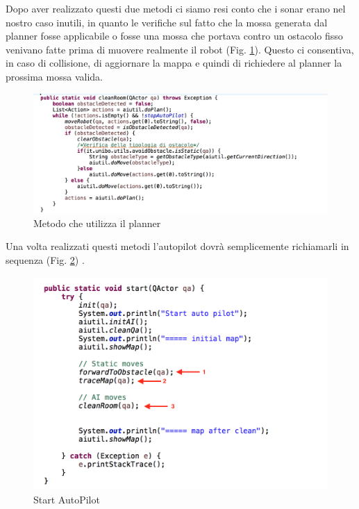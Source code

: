 \documentclass{llncs}
\begin{document}
Dopo aver realizzato questi due metodi ci siamo resi conto che i sonar erano nel nostro caso inutili, in quanto le verifiche sul fatto che la mossa generata dal planner fosse applicabile o fosse una mossa che portava contro un ostacolo fisso venivano fatte prima di muovere realmente il robot (Fig. \hyperref[fig:clearRoom]{\ref{fig:clearRoom}}). Questo ci consentiva, in caso di collisione, di aggiornare la mappa e quindi di richiedere al planner la prossima mossa valida.\\
\begin{figure}
    \centering
    \includegraphics[width=1\textwidth]{Immagini/Requisito5/clearRoom.png}
    \caption{Metodo che utilizza il planner}
    \label{fig:clearRoom}
\end{figure}
Una volta realizzati questi metodi l'autopilot dovr\`a semplicemente richiamarli in sequenza (Fig. \hyperref[fig:autopilot]{\ref{fig:autopilot}}) .\\
\begin{figure}
    \centering
    \includegraphics[width=1\textwidth]{Immagini/Requisito5/AutoPilot.png}
    \caption{Start AutoPilot}
    \label{fig:autopilot}
\end{figure}
\end{document}
